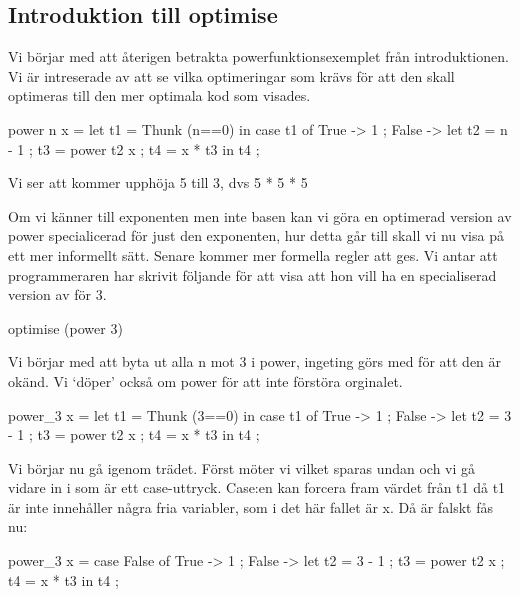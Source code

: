 \documentclass[../Optimise]{subfiles}
\begin{document}
\subsection{Introduktion till optimise}

Vi börjar med att återigen betrakta powerfunktionsexemplet från introduktionen. Vi är
intreserade av att se vilka optimeringar som krävs för att den skall optimeras till den
mer optimala kod som visades.
\begin{codeEx}
power n x = let t1 = Thunk (n==0)
    in case t1 of
        { True -> 1
        ; False -> let 
            { t2 = n - 1 
            ; t3 = power t2 x
            ; t4 = x * t3
            } in t4
        };
\end{codeEx}
Vi ser att  kommer upphöja 5 till 3, dvs 5 * 5 * 5

Om vi känner till exponenten men inte basen kan vi göra en optimerad version av power
specialicerad för just den exponenten, hur detta går till skall vi nu visa på ett 
mer informellt sätt. Senare kommer mer formella regler att ges. Vi antar att programmeraren
har skrivit följande för att visa att hon vill ha en specialiserad version av  för $3$.

\begin{codeEx}
optimise (power 3)
\end{codeEx}

Vi börjar med att byta ut alla n mot 3 i power, ingeting görs med  för 
att den är okänd. Vi `döper' också om power för att inte förstöra orginalet.
\begin{codeEx}
power_3 x = let t1 = Thunk (3==0)
    in case t1 of
        { True -> 1
        ; False -> let 
            { t2 = 3 - 1 
            ; t3 = power t2 x
            ; t4 = x * t3
            } in t4
        };
\end{codeEx}

Vi börjar nu gå igenom trädet. Först möter vi  vilket sparas undan och vi gå vidare in i  som är ett case-uttryck. Case:en kan forcera fram värdet från t1 då t1 är inte innehåller några fria variabler, som i det här fallet är x. Då  är falskt fås nu: 

\begin{codeEx}
power_3 x = case False of
    { True -> 1
    ; False -> let 
        { t2 = 3 - 1 
        ; t3 = power t2 x
        ; t4 = x * t3
        } in t4
    };
\end{codeEx}
\end{document}
